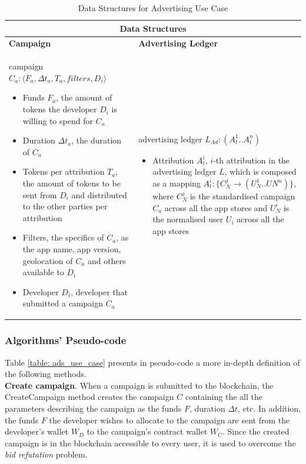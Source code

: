 \begin{table}[H]
\footnotesize
\centering
\begin{tabular}{|p{}p{}|}
\hline
\multicolumn{2}{|c|}{Data Structures} \\
\hline \vspace{0.05cm}
\textbf{Campaign} & \vspace{0.05cm} \textbf{Advertising Ledger} \\
campaign $C_a : \langle F_{a}, \Delta t_{a}, T_{a}, filters, D_i \rangle$
\begin{itemize}
	\item Funds $F_{a}$, the amount of tokens the developer $D_{i}$ is willing to spend for $C_{a}$
	\item Duration $\Delta t_{a}$, the duration of $C_{a}$
	\item Tokens per attribution $T_{a}$, the amount of tokens to be sent from $D_{i}$ and distributed to the other parties per attribution
	\item Filters, the specifics of $C_{a}$, as the app name, app version, geolocation of $C_{a}$ and others available to $D_{i}$
	\item Developer $D_i$, developer that submitted a campaign $C_a$
\end{itemize} &
advertising ledger $L_{Ad} : (A^{1}_{t}..A^{n}_{t})$
\begin{itemize}
	\item Attribution $A^{i}_{t}$, $i$-th attribution in the advertising ledger $L$, which is composed as a mapping $A^{i}_{t} : \{C_{N}^{j} \to (U_{N}^{1}..U{N}^{n})\}$, where $C_{N}^{j}$ is the standardised campaign $C_a$ across all the app stores and $U_{N}^{i}$ is the normalised user $U_i$ across all the app stores
\end{itemize} \\
\hline
\end{tabular}
\caption{Data Structures for Advertising Use Case}
\label{table: data_structures_ad}
\end{table}


\subsubsection{Algorithms' Pseudo-code}

Table \ref{table: ads_use_case} presents in pseudo-code a more in-depth definition of the following methods. \\

\noindent \textbf{Create campaign}. When a campaign is submitted to the blockchain, the \textsf{CreateCampaign} method creates the campaign $C$ containing the all the parameters describing the campaign as the funds $F$, duration $\Delta t$, etc. In addition, the funds $F$ the developer wishes to allocate to the campaign are sent from the developer's wallet $W_D$ to the campaign's contract wallet $W_C$. Since the created campaign is in the blockchain accessible to every user, it is used to overcome the \textit{bid refutation} problem.\\

